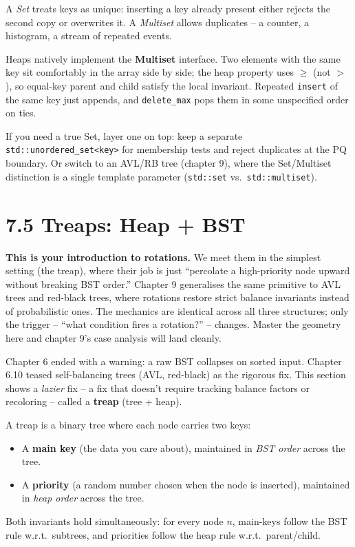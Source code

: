 \documentclass[11pt]{article}
\begin{document}
\begin{notebox}
A \emph{Set} treats keys as unique: inserting a key already present
either rejects the second copy or overwrites it. A \emph{Multiset}
allows duplicates -- a counter, a histogram, a stream of repeated
events.

Heaps natively implement the \textbf{Multiset} interface. Two
elements with the same key sit comfortably in the array side by
side; the heap property uses $\ge$ (not $>$), so equal-key parent
and child satisfy the local invariant. Repeated \texttt{insert} of
the same key just appends, and \texttt{delete\_max} pops them in
some unspecified order on ties.

If you need a true Set, layer one on top: keep a separate
\texttt{std::unordered\_set<key>} for membership tests and reject
duplicates at the PQ boundary. Or switch to an AVL/RB tree
(chapter 9), where the Set/Multiset distinction is a single template
parameter (\texttt{std::set} vs.\ \texttt{std::multiset}).
\end{notebox}

\section{7.5 Treaps: Heap + BST}

\textbf{This is your introduction to rotations.} We meet them in the
simplest setting (the treap), where their job is just ``percolate a
high-priority node upward without breaking BST order.'' Chapter 9
generalises the same primitive to AVL trees and red-black trees, where
rotations restore strict balance invariants instead of probabilistic
ones. The mechanics are identical across all three structures; only
the trigger -- ``what condition fires a rotation?'' -- changes. Master
the geometry here and chapter 9's case analysis will land cleanly.

Chapter 6 ended with a warning: a raw BST collapses on sorted input. Chapter 6.10 teased self-balancing trees (AVL, red-black) as the rigorous fix. This section shows a \emph{lazier} fix -- a fix that doesn't require tracking balance factors or recoloring -- called a \textbf{treap} (tree + heap).

\begin{defnbox}[Treap]
A treap is a binary tree where each node carries two keys:
\begin{itemize}[leftmargin=*]
    \item A \textbf{main key} (the data you care about), maintained in \emph{BST order} across the tree.
    \item A \textbf{priority} (a random number chosen when the node is inserted), maintained in \emph{heap order} across the tree.
\end{itemize}
Both invariants hold simultaneously: for every node $n$, main-keys follow the BST rule w.r.t.\ subtrees, and priorities follow the heap rule w.r.t.\ parent/child.
\end{defnbox}
\end{document}
